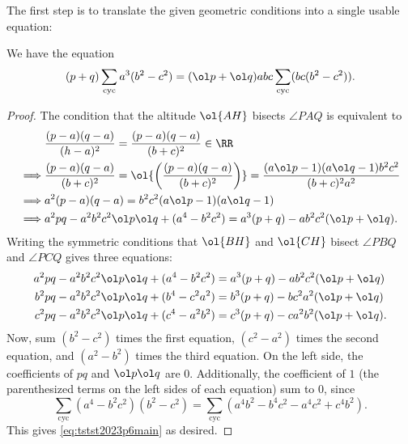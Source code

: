 \documentclass[11pt]{scrartcl}
\begin{document}
The first step is to translate the given geometric conditions into a single
usable equation:
\begin{claim*}
  We have the equation
  \begin{equation}
    (p+q)\sum_{\text{cyc}}a^3(b^2-c^2)
    = (\ol p+\ol q)abc\sum_{\text{cyc}}(bc(b^2-c^2)).
    \label{eq:tstst2023p6main}
  \end{equation}
\end{claim*}
\begin{proof}
  The condition that the altitude $\ol{AH}$ bisects $\angle PAQ$ is equivalent to
  \begin{align*}
    & \frac{(p-a)(q-a)}{(h-a)^2} = \frac{(p-a)(q-a)}{(b+c)^2}\in\RR \\
    \implies &\frac{(p-a)(q-a)}{(b+c)^2} = \ol{\left(\frac{(p-a)(q-a)}{(b+c)^2}\right)}
    = \frac{(a\ol p-1)(a\ol q-1)b^2c^2}{(b+c)^2a^2} \\
    \implies & a^2(p-a)(q-a) = b^2c^2(a\ol p-1)(a\ol q-1) \\
    \implies & a^2pq-a^2b^2c^2\ol p\ol q+(a^4-b^2c^2)
      = a^3(p+q)-ab^2c^2(\ol p+\ol q).
    \end{align*}
  Writing the symmetric conditions that $\ol{BH}$ and $\ol{CH}$
  bisect $\angle PBQ$ and $\angle PCQ$ gives three equations:
  \begin{align*}
    a^2pq - a^2b^2c^2\ol p\ol q + (a^4-b^2c^2)
      &= a^3(p+q) - ab^2c^2(\ol p+\ol q) \\
    b^2pq - a^2b^2c^2\ol p\ol q + (b^4-c^2a^2)
      &= b^3(p+q) - bc^2a^2(\ol p+\ol q) \\
    c^2pq - a^2b^2c^2\ol p\ol q + (c^4-a^2b^2)
      &=c^3(p+q) - ca^2b^2(\ol p+\ol q).
  \end{align*}
  Now, sum $(b^2-c^2)$ times the first equation,
  $(c^2-a^2)$ times the second equation, and $(a^2-b^2)$ times the third equation.
  On the left side, the coefficients of $pq$ and $\ol p\ol q$ are $0$.
  Additionally, the coefficient of $1$
  (the parenthesized terms on the left sides of each equation) sum to $0$, since
  \[ \sum_{\text{cyc}}(a^4-b^2c^2)(b^2-c^2)
    = \sum_{\text{cyc}}(a^4b^2-b^4c^2-a^4c^2+c^4b^2). \]
  This gives \eqref{eq:tstst2023p6main} as desired.
\end{proof}
\end{document}
